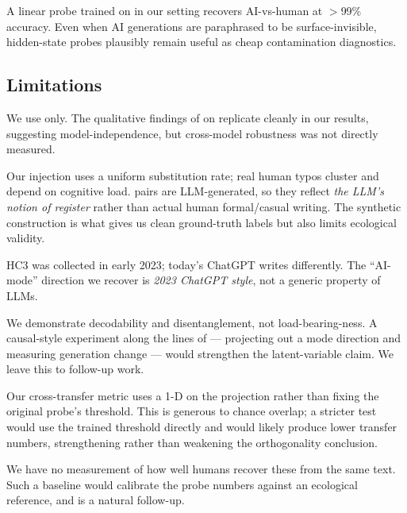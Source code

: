  A linear probe trained on \aihuman in our setting recovers AI-vs-human at $>$99\% accuracy. Even when AI generations are paraphrased to be surface-invisible, hidden-state probes plausibly remain useful as cheap contamination diagnostics.

\subsection{Limitations}

 We use \qwen only. The qualitative findings of \citet{sarfati2025prompt} on \llama replicate cleanly in our \authorship results, suggesting model-independence, but cross-model robustness was not directly measured.

 Our \typo injection uses a uniform substitution rate; real human typos cluster and depend on cognitive load. \register pairs are LLM-generated, so they reflect \emph{the LLM's notion of register} rather than actual human formal/casual writing. The synthetic construction is what gives us clean ground-truth labels but also limits ecological validity.

 HC3 was collected in early 2023; today's ChatGPT writes differently. The ``AI-mode'' direction we recover is \emph{2023 ChatGPT style}, not a generic property of LLMs.

 We demonstrate decodability and disentanglement, not load-bearing-ness. A causal-style experiment along the lines of \citet{li2022emergent} --- projecting out a mode direction and measuring generation change --- would strengthen the latent-variable claim. We leave this to follow-up work.

 Our cross-transfer metric uses a 1-D \logreg on the projection rather than fixing the original probe's threshold. This is generous to chance overlap; a stricter test would use the trained threshold directly and would likely produce lower transfer numbers, strengthening rather than weakening the orthogonality conclusion.

 We have no measurement of how well humans recover these \modes from the same text. Such a baseline would calibrate the probe numbers against an ecological reference, and is a natural follow-up.
